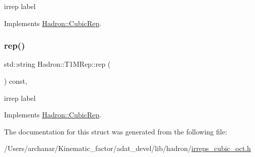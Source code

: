 irrep label 

Implements \mbox{\hyperlink{structHadron_1_1CubicRep_ac3eb63608803d44c68681f158e14eb1b}{Hadron\+::\+Cubic\+Rep}}.

\mbox{\label{structHadron_1_1T1MRep_a2a30092deab94944ea636fd8715be68d}} 
\subsubsection{\texorpdfstring{rep()}{rep()}\hspace{0.1cm}{\footnotesize\ttfamily [2/2]}}
{\footnotesize\ttfamily std\+::string Hadron\+::\+T1\+M\+Rep\+::rep (\begin{DoxyParamCaption}{ }\end{DoxyParamCaption}) const\hspace{0.3cm}{\ttfamily [inline]}, {\ttfamily [virtual]}}

irrep label 

Implements \mbox{\hyperlink{structHadron_1_1CubicRep_ac3eb63608803d44c68681f158e14eb1b}{Hadron\+::\+Cubic\+Rep}}.



The documentation for this struct was generated from the following file\+:\begin{DoxyCompactItemize}
\item 
/\+Users/archanar/\+Kinematic\+\_\+factor/adat\+\_\+devel/lib/hadron/\mbox{\hyperlink{lib_2hadron_2irreps__cubic__oct_8h}{irreps\+\_\+cubic\+\_\+oct.\+h}}\end{DoxyCompactItemize}
